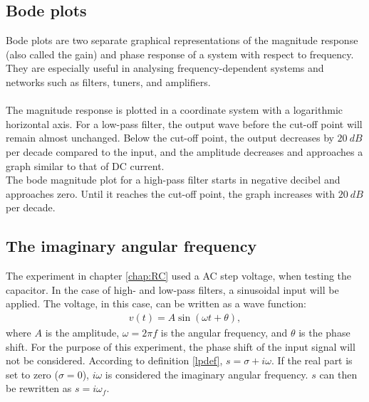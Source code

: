\subsection{Bode plots} \label{sub:bode}
Bode plots are two separate graphical representations of the magnitude response (also called the gain) and phase response of a system with respect to frequency. They are especially useful in analysing frequency-dependent systems and networks such as filters, tuners, and amplifiers. \cite [p. 626]{bcircuit5}  \\
\\
The magnitude response is plotted in a coordinate system with a logarithmic horizontal axis. For a low-pass filter, the output wave before the cut-off point will remain almost unchanged. Below the cut-off point, the output decreases by $20\ dB$ per decade compared to the input, and the amplitude decreases and approaches a graph similar to that of DC current. \\
The bode magnitude plot for a high-pass filter starts in negative decibel and approaches zero. Until it reaches the cut-off point, the graph increases with $20\ dB$ per decade.

\subsection{The imaginary angular frequency}\label{sub:imfreq}
The experiment in chapter \ref{chap:RC} used a AC step voltage, when testing the capacitor. In the case of high- and low-pass filters, a sinusoidal input will be applied. The voltage, in this case, can be written as a wave function:
\begin{align*}
v(t)=A\sin(\omega t+\theta),
\end{align*}
where $A$ is the amplitude, $\omega=2\pi f$ is the angular frequency, and $\theta$ is the phase shift. For the purpose of this experiment, the phase shift of the input signal will not be considered. According to definition \ref{lpdef}, $s=\sigma + i \omega$. If the real part is set to zero ($\sigma = 0$), $i \omega$ is considered the imaginary angular frequency. $s$ can then be rewritten as $s = i \omega_f$. \cite[p. 733 - 735]{bcircuit9}

